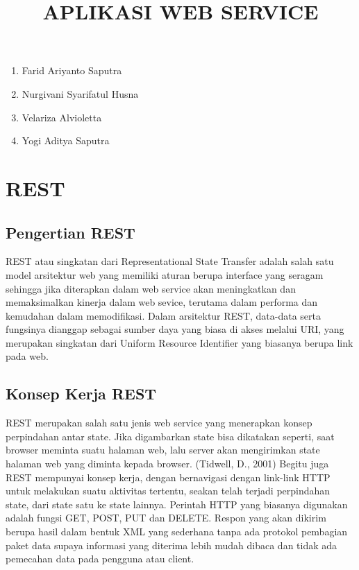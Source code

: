 \documentclass[12pt,a4paper]{article}
\begin{document}
\title{APLIKASI WEB SERVICE}
\maketitle

\begin{enumerate}
\item Farid Ariyanto Saputra
\item Nurgivani Syarifatul Husna
\item Velariza Alvioletta
\item Yogi Aditya Saputra
\end{enumerate}

\section{REST}
\subsection{Pengertian REST}
REST atau singkatan dari Representational State Transfer adalah salah satu model arsitektur web yang memiliki aturan berupa interface yang seragam sehingga jika diterapkan dalam web service akan meningkatkan dan memaksimalkan kinerja dalam web sevice, terutama dalam performa dan kemudahan dalam memodifikasi. Dalam arsitektur REST, data-data serta fungsinya dianggap sebagai sumber daya yang biasa di akses melalui URI, yang merupakan singkatan dari Uniform Resource Identifier yang biasanya berupa link pada web.
\subsection{Konsep Kerja REST}
REST merupakan salah satu jenis web service yang menerapkan konsep perpindahan antar state. Jika digambarkan state bisa dikatakan seperti, saat browser meminta suatu halaman web, lalu server akan mengirimkan state halaman web yang diminta kepada browser. (Tidwell, D., 2001) Begitu juga REST mempunyai konsep kerja, dengan bernavigasi dengan link-link HTTP untuk melakukan suatu aktivitas tertentu, seakan telah terjadi perpindahan state, dari state satu ke state lainnya. Perintah  HTTP yang biasanya digunakan adalah fungsi GET, POST, PUT dan DELETE. Respon yang akan dikirim berupa hasil dalam bentuk XML yang sederhana tanpa ada protokol pembagian paket data supaya informasi yang diterima lebih mudah dibaca dan tidak ada pemecahan data pada pengguna atau client.
\end{document}
